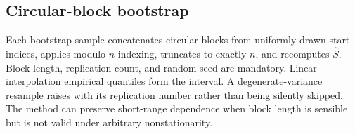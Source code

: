 \subsection{Circular-block bootstrap}

Each bootstrap sample concatenates circular blocks from uniformly drawn start
indices, applies modulo-\(n\) indexing, truncates to exactly \(n\), and
recomputes \(\widehat S\).  Block length, replication count, and random seed
are mandatory.  Linear-interpolation empirical quantiles form the interval.
A degenerate-variance resample raises with its replication number rather than
being silently skipped.  The method can preserve short-range dependence when
block length is sensible but is not valid under arbitrary nonstationarity.
